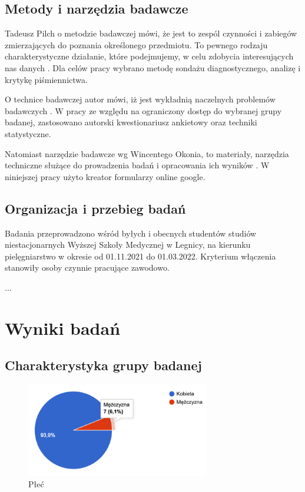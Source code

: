 \documentclass[a4paper,12pt,twoside,openany]{report}
\begin{document}
\section{Metody i narzędzia badawcze}
Tadeusz Pilch o metodzie badawczej mówi, że jest to zespól czynności i zabiegów zmierzających do poznania określonego przedmiotu. To pewnego rodzaju charakterystyczne działanie, które podejmujemy, w celu zdobycia interesujących nas danych \cite{tadeusz}. Dla celów pracy wybrano metodę sondażu diagnostycznego, analizę i krytykę piśmiennictwa.\cite{krys}

O technice badawczej autor mówi, iż jest wykładnią naczelnych problemów badawczych \cite{tadeusz}. W pracy ze względu na ograniczony dostęp do wybranej grupy badanej, zastosowano autorski kwestionariusz ankietowy oraz techniki statystyczne.

Natomiast narzędzie badawcze wg Wincentego Okonia, to materiały, narzędzia techniczne służące do prowadzenia badań i opracowania ich wyników \cite{winc}. W niniejszej pracy użyto kreator formularzy online google.

\section{Organizacja i przebieg badań}
Badania przeprowadzono wśród byłych i obecnych studentów studiów niestacjonarnych Wyższej Szkoły Medycznej w Legnicy, na kierunku pielęgniarstwo w okresie od 01.11.2021 do 01.03.2022. Kryterium włączenia stanowiły osoby czynnie pracujące zawodowo. 

...

\chapter{Wyniki badań}

\section{Charakterystyka grupy badanej}

\begin{figure}
\includegraphics[width=8cm]{char_gr_bad/plec00}
\caption{Płeć}
\end{figure}
\end{document}
